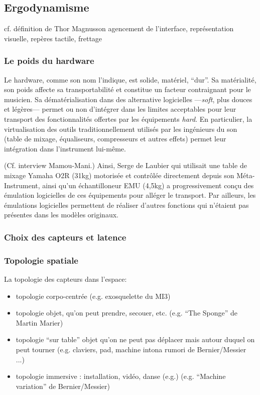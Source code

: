 \subsection{Ergodynamisme}
cf. définition de Thor Magnusson
agencement de l’interface, représentation visuelle, repères tactile, frettage

\subsubsection{Le poids du hardware}

\noindent Le hardware, comme son nom l'indique, est solide, matériel, ``dur''. Sa matérialité, son poids affecte sa transportabilité et constitue un facteur contraignant pour le musicien. Sa dématérialisation dans des alternative logicielles —\textit{soft}, plus douces et légères— permet ou non d'intégrer dans les limites acceptables pour leur transport des fonctionnalités offertes par les équipements \textit{hard}.
En particulier, la virtualisation des outils traditionnellement utilisés par les ingénieurs du son (table de mixage, équaliseurs, compresseurs et autres effets) permet leur intégration dans l'instrument lui-même.

(Cf. interview Mamou-Mani.)
Ainsi, Serge de Laubier qui utilisait une table de mixage Yamaha O2R (31kg) motorisée et contrôlée directement depuis son Méta-Instrument, ainsi qu'un échantilloneur EMU (4,5kg) a progressivement conçu des émulation logicielles de ces équipements pour alléger le transport. Par ailleurs, les émulations logicielles permettent de réaliser d'autres fonctions qui n'étaient pas présentes dans les modèles originaux.


\subsubsection{Choix des capteurs et latence}




\subsubsection{Topologie spatiale}

La topologie des capteurs dans l'espace:
\vspace{-1em}
\begin{itemize}[noitemsep]
	\item topologie corpo-centrée (e.g. exosquelette du MI3)
	\item topologie objet, qu'on peut prendre, secouer, etc. (e.g. ``The Sponge'' de Martin Marier)
	\item topologie ``sur table'' objet qu'on ne peut pas déplacer mais autour duquel on peut tourner (e.g. claviers, pad, machine intona rumori de Bernier/Messier ...)
	\item topologie immersive : installation, vidéo, danse (e.g.) (e.g. ``Machine variation'' de Bernier/Messier)
\end{itemize}



